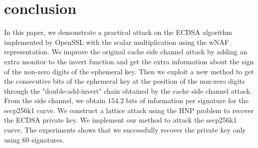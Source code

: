 \section{conclusion}
\label{sec:conclusion}
In this paper, we demonstrate a practical attack on the ECDSA algorithm implemented by OpenSSL with the scalar multiplication using the wNAF representation.
We improve the original cache side channel attack by adding an extra monitor to the invert function and get the extra information about the sign of the non-zero digits of the ephemeral key.
Then we exploit a new method to get the consecutive bits of the ephemeral key at the position of the non-zero digits through the "double-add-invert" chain obtained by the cache side channel attack.
From the side channel, we obtain $154.2$ bits of information per signature for the secp256k1 curve.
We construct a lattice attack using the HNP problem to recover the ECDSA private key.
We implement our method to attack the secp256k1 curve.
The experiments shows that we successfully recover the private key only using $60$ signatures.






